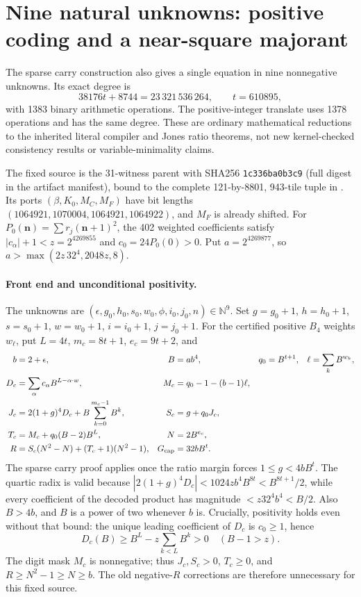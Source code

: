 \section{Nine natural unknowns: positive coding and a near-square majorant}
\label{sec:nine-b4}
The sparse carry construction also gives a single equation in nine
nonnegative unknowns. Its exact degree is
\[
  38176t+8744=23\,321\,536\,264,\qquad t=610895,
\]
with 1383 binary arithmetic operations. The positive-integer translate uses
1378 operations and has the same degree. These are ordinary mathematical
reductions to the inherited literal compiler and Jones ratio theorems,
not new kernel-checked consistency results or variable-minimality claims.

The fixed source is the 31-witness parent with SHA256
\texttt{1c336ba0b3c9} (full digest in the artifact manifest),
bound to the complete 121-by-8801, 943-tile tuple in
.
Its ports $(\beta,K_0,M_C,M_F)$ have bit lengths
$(1064921,1070004,1064921,1064922)$, and $M_F$ is already shifted.
For $P_0(\mathbf n)=\sum r_j(\mathbf n+1)^2$, the 402 weighted
coefficients satisfy $|c_\alpha|+1<z=2^{4269855}$ and
$c_0=24P_0(0)>0$. Put $a=2^{4269877}$, so
$a>\max(2z\,32^4,2048z,8)$.

\paragraph{Front end and unconditional positivity.}
The unknowns are $(\epsilon,g_0,h_0,s_0,w_0,\phi,i_0,j_0,n)\in\mathbb N^9$.
Set $g=g_0+1$, $h=h_0+1$, $s=s_0+1$, $w=w_0+1$, $i=i_0+1$,
$j=j_0+1$. For the certified positive $B_4$ weights $w_\ell$, put
$L=4t$, $m_c=8t+1$, $e_c=9t+2$, and
\begin{align*}
 b&=2+\epsilon,& B&=ab^4,& q_0&=B^{t+1},& \ell&=\sum_kB^{w_k},\\
 D_c&=\sum_\alpha c_\alpha B^{L-\alpha\cdot w},&
 M_c&=q_0-1-(b-1)\ell,\\
 J_c&=2(1+g)^4D_c+B\sum_{k=0}^{m_c-1}B^k,&
 S_c&=g+q_0J_c,\\
 T_c&=M_c+q_0(B-2)B^L,& N&=2B^{e_c},\\
 R&=S_c(N^2-N)+(T_c+1)(N^2-1),&G_{\rm cap}&=32bB^t.
\end{align*}
The sparse carry proof applies once the ratio margin forces
$1\leq g<4bB^t$. The quartic radix is valid because
$|2(1+g)^4D_c|<1024zb^4B^{8t}<B^{8t+1}/2$, while every
coefficient of the decoded product has magnitude
$<z32^4b^4<B/2$. Also $B>4b$, and $B$ is a power of two whenever $b$ is. Crucially, positivity holds even without that bound:
the unique leading coefficient of $D_c$ is $c_0\geq1$, hence
\[
 D_c(B)\geq B^L-z\sum_{k<L}B^k>0\quad(B-1>z).
\]
The digit mask $M_c$ is nonnegative; thus $J_c,S_c>0$, $T_c\geq0$,
and $R\geq N^2-1\geq N\geq b$. The old negative-$R$ corrections
are therefore unnecessary for this fixed source.

